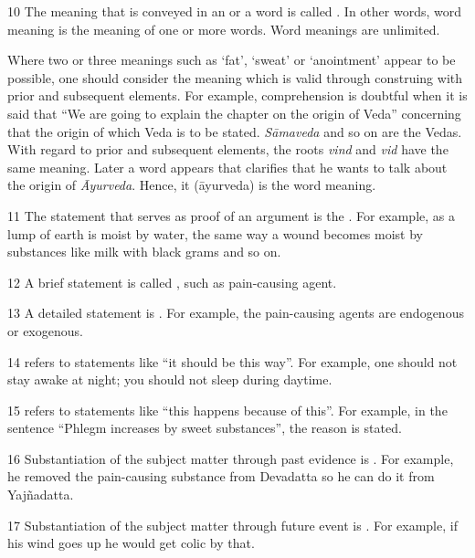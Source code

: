 \begin{translation}
\item [10] The meaning that is conveyed in an  or a word is 
called . In other words, word meaning is the 
meaning of one or more words. Word meanings are unlimited. 

   Where two or three meanings such as `fat’, `sweat’ or `anointment’ appear to be possible, one should consider the meaning which is valid through construing with prior and subsequent elements. For example, comprehension is doubtful when it is said that “We are going to explain the chapter on the origin of Veda” concerning that the origin of which Veda is to be stated. \emph{Sāmaveda} and so on are the Vedas. With regard to prior and subsequent elements, the roots \emph{vind} and \emph{vid} have the same meaning. Later a word appears that clarifies that he wants to talk about the origin of \emph{Āyurveda}. Hence, it (āyurveda) is the word meaning.  

\item [11] The statement that serves as proof of an argument is the 
. For example, as a lump of earth is moist by water, the 
same way a wound becomes moist by substances like milk with black grams and 
so on.  

\item [12] A brief statement is called , such as 
 {pain-causing agent}. 

\item [13] A detailed statement is . For example, the 
pain-causing agents are endogenous or exogenous. 

\item [14]  refers to statements like ``it should be this way''. For example, one should not stay awake at night; 
you should not sleep during daytime.  

\item [15]  refers to statements like “this happens because of this”. For example, in the sentence “Phlegm 
increases by sweet substances”, the reason is stated.  

\item [16] Substantiation of the subject matter through past evidence is . 
For example, he removed the pain-causing substance 
from Devadatta so he can do it from Yajñadatta. 

\item [17] Substantiation of the subject matter through future event is 
. For example, if his wind goes up he would get colic by that. 


\end{translation}
